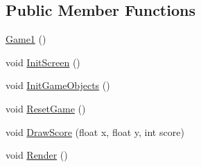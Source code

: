 \subsection*{Public Member Functions}
\begin{DoxyCompactItemize}
\item 
\hyperlink{class_ping___pong_1_1_game1_ab146cd91df1ef58f9a58935843ed787b}{Game1} ()
\item 
void \hyperlink{class_ping___pong_1_1_game1_a06c80c174c822247fb58b9ce3d6c18b2}{Init\-Screen} ()
\item 
void \hyperlink{class_ping___pong_1_1_game1_a18d2c9e0d2bb1f3432c54781a8c822e7}{Init\-Game\-Objects} ()
\item 
void \hyperlink{class_ping___pong_1_1_game1_a30e3122abc5d6d6555b394ef9dfea097}{Reset\-Game} ()
\item 
void \hyperlink{class_ping___pong_1_1_game1_a5e2d8c065ebbe30b5452d6e6366d21ff}{Draw\-Score} (float x, float y, int score)
\item 
void \hyperlink{class_ping___pong_1_1_game1_ad22887afd5e5fe23c2d5d218556046ee}{Render} ()
\end{DoxyCompactItemize}
